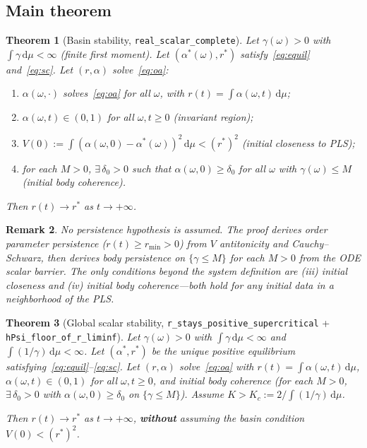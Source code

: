 \documentclass[11pt,a4paper]{article}
\newtheorem{theorem}{Theorem}[section]
\newtheorem{remark}[theorem]{Remark}
\theoremstyle{definition}
\begin{document}
\subsection{Main theorem}

\begin{theorem}[Basin stability, \texttt{real\_scalar\_complete}]\label{thm:main}
Let $\gamma(\omega) > 0$ with $\int \gamma\,\mathrm{d}\mu < \infty$ (finite first moment). Let $(\alpha^*(\omega), r^*)$ satisfy~\eqref{eq:equil} and~\eqref{eq:sc}. Let $(r, \alpha)$ solve~\eqref{eq:oa}:
\begin{enumerate}[label=(\roman*)]
\item $\alpha(\omega,\cdot)$ solves~\eqref{eq:oa} for all $\omega$, with $r(t) = \int \alpha(\omega,t)\,\mathrm{d}\mu$;
\item $\alpha(\omega,t) \in (0,1)$ for all $\omega, t \geq 0$ (invariant region);
\item $V(0) := \int (\alpha(\omega,0) - \alpha^*(\omega))^2\,\mathrm{d}\mu < (r^*)^2$ (initial closeness to PLS);
\item for each $M > 0$, $\exists\,\delta_0 > 0$ such that $\alpha(\omega,0) \geq \delta_0$ for all $\omega$ with $\gamma(\omega) \leq M$ (initial body coherence).
\end{enumerate}
Then $r(t) \to r^*$ as $t \to +\infty$.
\end{theorem}

\begin{remark}
No persistence hypothesis is assumed. The proof \emph{derives} order parameter persistence ($r(t) \geq r_{\min} > 0$) from $V$ antitonicity and Cauchy--Schwarz, then derives body persistence on $\{\gamma \leq M\}$ for each $M > 0$ from the ODE scalar barrier. The only conditions beyond the system definition are (iii) initial closeness and (iv) initial body coherence---both hold for any initial data in a neighborhood of the PLS.
\end{remark}

\begin{theorem}[Global scalar stability, \texttt{r\_stays\_positive\_supercritical} + \texttt{hPsi\_floor\_of\_r\_liminf}]\label{thm:global}
Let $\gamma(\omega) > 0$ with $\int \gamma\,\mathrm{d}\mu < \infty$ and $\int (1/\gamma)\,\mathrm{d}\mu < \infty$. Let $(\alpha^*, r^*)$ be the unique positive equilibrium satisfying~\eqref{eq:equil}--\eqref{eq:sc}. Let $(r, \alpha)$ solve~\eqref{eq:oa} with $r(t) = \int \alpha(\omega,t)\,\mathrm{d}\mu$, $\alpha(\omega,t) \in (0,1)$ for all $\omega, t \geq 0$, and initial body coherence (for each $M > 0$, $\exists\,\delta_0 > 0$ with $\alpha(\omega,0) \geq \delta_0$ on $\{\gamma \leq M\}$). Assume $K > K_c := 2/\int(1/\gamma)\,\mathrm{d}\mu$.

Then $r(t) \to r^*$ as $t \to +\infty$, \textbf{without} assuming the basin condition $V(0) < (r^*)^2$.
\end{theorem}
\end{document}
